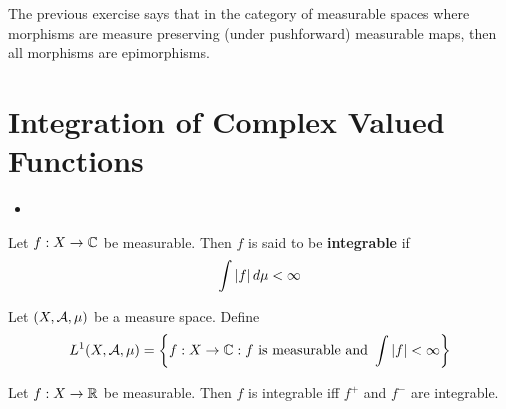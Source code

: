 \documentclass{book}
\begin{document}
	\begin{note}
		The previous exercise says that in the category of measurable spaces where morphisms are measure preserving (under pushforward) measurable maps, then all morphisms are epimorphisms. 
	\end{note}

	
	
	
	
	
	
	
	
	
	
	
	
	
	
	
	
	\newpage
	\section{Integration of Complex Valued Functions}
	
	\begin{itemize}
		\item {}
	\end{itemize}
	
	\begin{defn}  
		Let $f:X \rightarrow \mathbb{C}$ be measurable. Then $f$ is said to be \textbf{integrable} if $$\int |f| \, d \mu < \infty$$
	\end{defn}
	
		
	
	\begin{defn}  
		Let $(X, \mathcal{A}, \mu)$ be a measure space. Define $$L^1(X, \mathcal{A}, \mu) = \bigg \{f:X \rightarrow \mathbb{C} : f \text{ is measurable and } \int |f| < \infty \bigg \}$$
	\end{defn}
	
	\begin{ex} 
		Let $f:X \rightarrow \mathbb{R}$ be measurable. Then $f$ is integrable iff $f^+$ and $f^-$ are integrable. 
	\end{ex}
	
\end{document}
